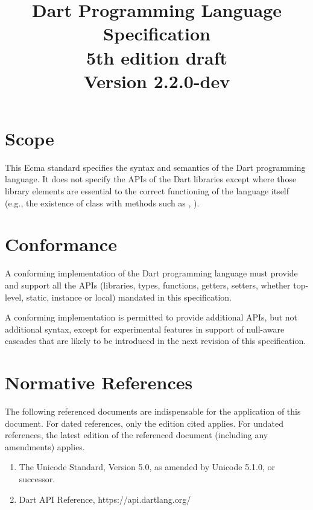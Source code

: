 \documentclass[makeidx]{article}
\title{Dart Programming Language Specification\\
{5th edition draft}\\
{\large Version 2.2.0-dev}}
\author{}
\begin{document}
\maketitle
\tableofcontents

\newpage

\pagestyle{myheadings}


\section{Scope}

\LMHash{}%
This Ecma standard specifies the syntax and semantics of the Dart programming language.
It does not specify the APIs of the Dart libraries except where those library elements are essential to the correct functioning of the language itself (e.g., the existence of class  with methods such as , ).


\section{Conformance}

\LMHash{}%
A conforming implementation of the Dart programming language must provide and support all the APIs (libraries, types, functions, getters, setters, whether top-level, static, instance or local) mandated in this specification.

\LMHash{}%
A conforming implementation is permitted to provide additional APIs, but not additional syntax, except for experimental features in support of null-aware cascades that are likely to be introduced in the next revision of this specification.


\section{Normative References}

\LMHash{}%
The following referenced documents are indispensable for the application of this document.
For dated references, only the edition cited applies.
For undated references, the latest edition of the referenced document (including any amendments) applies.

\begin{enumerate}
\item
  The Unicode Standard, Version 5.0, as amended by Unicode 5.1.0, or successor.
\item
  Dart API Reference, https://api.dartlang.org/
\end{enumerate}
\end{document}
